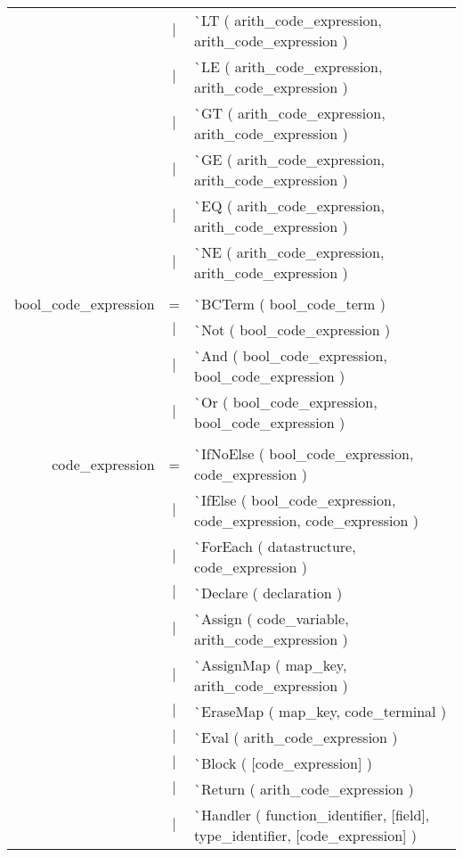\documentclass{article}
\begin{document}
\begin{tabular}[ht] {rcl}
&$\lvert$ & \`{}LT ( arith\_code\_expression, arith\_code\_expression )\\
&$\lvert$ & \`{}LE ( arith\_code\_expression, arith\_code\_expression )\\
&$\lvert$ & \`{}GT ( arith\_code\_expression, arith\_code\_expression )\\
&$\lvert$ & \`{}GE ( arith\_code\_expression, arith\_code\_expression )\\
&$\lvert$ & \`{}EQ ( arith\_code\_expression, arith\_code\_expression )\\
&$\lvert$ & \`{}NE ( arith\_code\_expression, arith\_code\_expression )\\
\\
bool\_code\_expression &=& \`{}BCTerm ( bool\_code\_term )\\
&$\lvert$ & \`{}Not ( bool\_code\_expression )\\
&$\lvert$ & \`{}And ( bool\_code\_expression, bool\_code\_expression )\\
&$\lvert$ & \`{}Or ( bool\_code\_expression, bool\_code\_expression )\\
\\
code\_expression &=& \`{}IfNoElse ( bool\_code\_expression, code\_expression )\\
&$\lvert$ & \`{}IfElse ( bool\_code\_expression, code\_expression, code\_expression )\\
&$\lvert$ & \`{}ForEach ( datastructure, code\_expression )\\
&$\lvert$ & \`{}Declare ( declaration )\\
&$\lvert$ & \`{}Assign ( code\_variable, arith\_code\_expression )\\
&$\lvert$ & \`{}AssignMap ( map\_key, arith\_code\_expression )\\
&$\lvert$ & \`{}EraseMap ( map\_key, code\_terminal )\\
&$\lvert$ & \`{}Eval ( arith\_code\_expression )\\
&$\lvert$ & \`{}Block ( [code\_expression] )\\
&$\lvert$ & \`{}Return ( arith\_code\_expression )\\
&$\lvert$ & \`{}Handler ( function\_identifier, [field], type\_identifier, [code\_expression] )\\
\end{tabular}
\pagebreak
\end{document}
